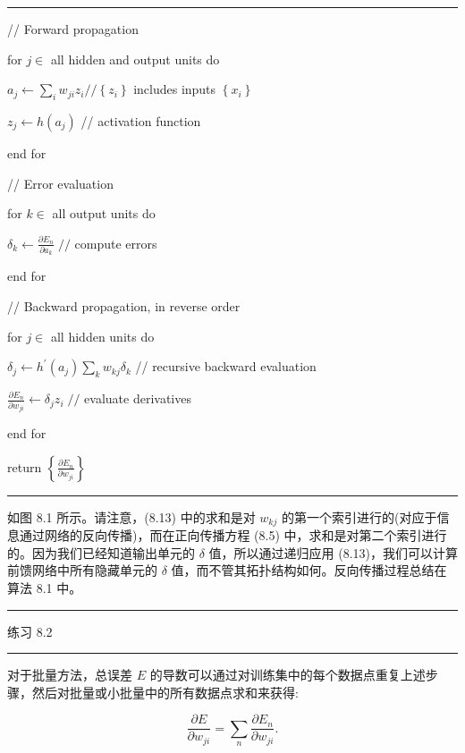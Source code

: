 \documentclass[10pt]{article}
\newcommand{\HRule}{\begin{center}\rule{0.9\linewidth}{0.2mm}\end{center}}
\begin{document}
\HRule

// Forward propagation

for \(j \in\) all hidden and output units do

\hspace*{1em} \({a}_{j} \leftarrow  \mathop{\sum }\limits_{i}{w}_{ji}{z}_{i}//\left\{  {z}_{i}\right\}\) includes inputs \(\left\{  {x}_{i}\right\}\)

\hspace*{1em} \({z}_{j} \leftarrow  h\left( {a}_{j}\right)\) // activation function

end for

// Error evaluation

for \(k \in\) all output units do

\hspace*{1em} \({\delta }_{k} \leftarrow  \frac{\partial {E}_{n}}{\partial {a}_{k}}\;//\) compute errors

end for

// Backward propagation, in reverse order

for \(j \in\) all hidden units do

\hspace*{1em} \({\delta }_{j} \leftarrow  {h}^{\prime }\left( {a}_{j}\right) \mathop{\sum }\limits_{k}{w}_{kj}{\delta }_{k}\) // recursive backward evaluation

\hspace*{1em} \(\frac{\partial {E}_{n}}{\partial {w}_{ji}} \leftarrow  {\delta }_{j}{z}_{i}\;//\) evaluate derivatives

end for

return \(\left\{  \frac{\partial {E}_{n}}{\partial {w}_{ji}}\right\}\)

\HRule

如图 8.1 所示。请注意，(8.13) 中的求和是对 \({w}_{kj}\) 的第一个索引进行的(对应于信息通过网络的反向传播)，而在正向传播方程 (8.5) 中，求和是对第二个索引进行的。因为我们已经知道输出单元的 \(\delta\) 值，所以通过递归应用 (8.13)，我们可以计算前馈网络中所有隐藏单元的 \(\delta\) 值，而不管其拓扑结构如何。反向传播过程总结在算法 8.1 中。

\HRule

练习 8.2

\HRule

对于批量方法，总误差 \(E\) 的导数可以通过对训练集中的每个数据点重复上述步骤，然后对批量或小批量中的所有数据点求和来获得:

\[
\frac{\partial E}{\partial {w}_{ji}} = \mathop{\sum }\limits_{n}\frac{\partial {E}_{n}}{\partial {w}_{ji}}. \tag{8.14}
\]
\end{document}
